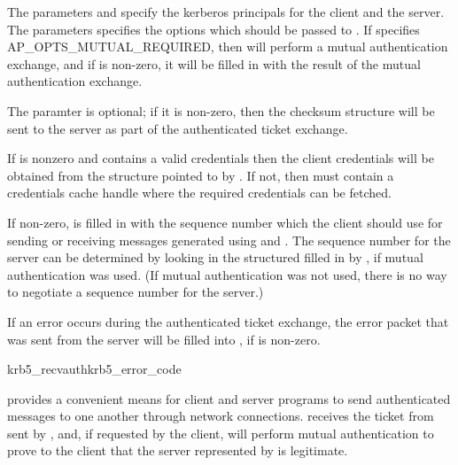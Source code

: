 The parameters  and  specify the
kerberos principals for the client and the server.  The
 parameters specifies the options which should
be passed to .  If 
specifies AP_OPTS_MUTUAL_REQUIRED, then  will
perform a mutual authentication exchange, and if 
is non-zero, it will be filled in with the result of the mutual
authentication exchange.

The  paramter is optional; if it is non-zero, then the
checksum structure will be sent to the server as part of the
authenticated ticket exchange.

If  is nonzero and contains a valid credentials then
the client credentials will be obtained from the structure pointed to by
.  If not, then  must contain a
credentials cache handle where the required credentials can be fetched.

If non-zero,  is filled in with the sequence number
which the client should use for sending or receiving messages generated
using  and .  The sequence
number for the server can be determined by looking in the structured
filled in by , if mutual authentication was used.
(If mutual authentication was not used, there is no way to negotiate a
sequence number for the server.)

If an error occurs during the authenticated ticket exchange, the error
packet that was sent from the server will be filled into
, if  is non-zero.

\begin{funcdecl}{krb5_recvauth}{krb5_error_code}
\funcin
{}
\funcout
{}
\end{funcdecl}

 provides a convenient means for client and
server programs to send authenticated messages to one another through
network connections.   receives the ticket from
sent by , and, if requested by the client, will
perform mutual authentication to prove to the client that the server
represented by  is legitimate.

